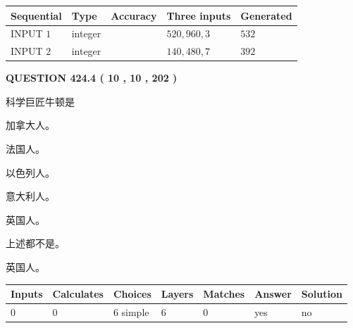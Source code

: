\documentclass{ctexart}
\begin{document}
   
  
  
\noindent\begin{tabular}{|l|l|l|l|l|}
\hline
 Sequential & Type & Accuracy & Three inputs & Generated \\ 
\hline
 
 
  INPUT $  1 $ & integer &  & $
 520
 , 
 960
 , 
 3
 $ & $ 532 $ 
 \\  \hline  
 
 
  INPUT $  2 $ & integer &  & $
 140
 , 
 480
 , 
 7
 $ & $ 392 $ 
 \\  \hline  
 \end{tabular}
   
   
  
\vspace{0.2in}
  
{\textbf{\Large{QUESTION
424.4 
 ( 10 , 10 , 202 )
}}}
  
  
科学巨匠牛顿是
 
 
加拿大人。
 
 
法国人。
 
 
以色列人。
 
 
意大利人。
 
 
英国人。
 
 
 上述都不是。
 
 
\noindent{}
 
 
英国人。
 
 
\noindent{}
 
 
   
   
   
   
\noindent\begin{tabular}{|l|l|l|l|l|l|l|}
 \hline
Inputs & Calculates & Choices & Layers & Matches & Answer & Solution \\ \hline
 0  & 
 0  & 
 6
  simple  
  & 
 6  & 
 0  & 
  yes & 
  no 
  \\ \hline
 \end{tabular}
   
   
   
   
\noindent{}
   
\end{document}
